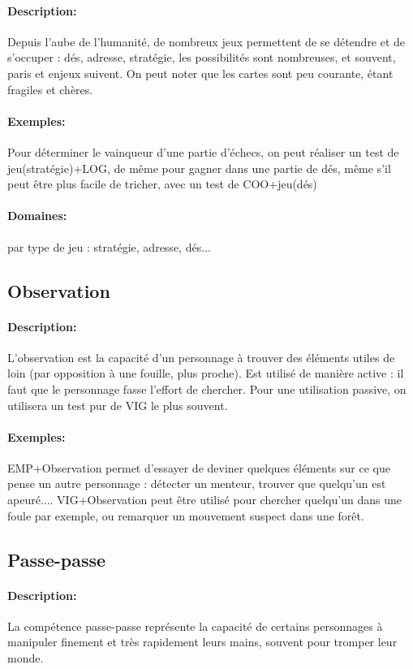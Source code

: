 \documentclass[10pt,a4paper,twocolumn]{book}
\begin{document}
\paragraph{Description:}Depuis l'aube de l'humanité, de nombreux jeux permettent de se détendre et de s'occuper : dés, adresse, stratégie, les possibilités sont nombreuses, et souvent, paris et enjeux suivent. On peut noter que les cartes sont peu courante, étant fragiles et chères.
\paragraph{Exemples:}Pour déterminer le vainqueur d'une partie d'échecs, on peut réaliser un test de jeu(stratégie)+LOG, de même pour gagner dans une partie de dés, même s'il peut être plus facile de tricher, avec un test de COO+jeu(dés)
\paragraph{Domaines:}par type de jeu : stratégie, adresse, dés...
\subsection{Observation}%
\paragraph{Description:}L'observation est la capacité d'un personnage à trouver des éléments utiles de loin (par opposition à une fouille, plus proche). Est utilisé de manière active : il faut que le personnage fasse l'effort de chercher. Pour une utilisation passive, on utilisera un test pur de VIG le plus souvent.
\paragraph{Exemples:}EMP+Observation permet d'essayer de deviner quelques éléments sur ce que pense un autre personnage : détecter un menteur, trouver que quelqu'un est apeuré.... VIG+Observation peut être utilisé pour chercher quelqu'un dans une foule par exemple, ou remarquer un mouvement suspect dans une forêt.
\subsection{Passe-passe}
\paragraph{Description:}La compétence passe-passe représente la capacité de certains personnages à manipuler finement et très rapidement leurs mains, souvent pour tromper leur monde.
\end{document}
